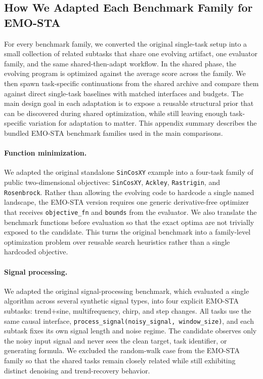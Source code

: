 
\subsection{How We Adapted Each Benchmark Family for EMO-STA}
\label{app:emo-sta-family-adaptations}

For every benchmark family, we converted the original single-task setup into a small collection of related subtasks that share one evolving artifact, one evaluator family, and the same shared-then-adapt workflow. In the shared phase, the evolving program is optimized against the average score across the family. We then spawn task-specific continuations from the shared archive and compare them against direct single-task baselines with matched interfaces and budgets. The main design goal in each adaptation is to expose a reusable structural prior that can be discovered during shared optimization, while still leaving enough task-specific variation for adaptation to matter. This appendix summary describes the bundled EMO-STA benchmark families used in the main comparisons.

\paragraph{Function minimization.}
We adapted the original standalone \texttt{SinCosXY} example into a four-task family of public two-dimensional objectives: \texttt{SinCosXY}, \texttt{Ackley}, \texttt{Rastrigin}, and \texttt{Rosenbrock}. Rather than allowing the evolving code to hardcode a single named landscape, the EMO-STA version requires one generic derivative-free optimizer that receives \texttt{objective\_fn} and \texttt{bounds} from the evaluator. We also translate the benchmark functions before evaluation so that the exact optima are not trivially exposed to the candidate. This turns the original benchmark into a family-level optimization problem over reusable search heuristics rather than a single hardcoded objective.

\paragraph{Signal processing.}
We adapted the original signal-processing benchmark, which evaluated a single algorithm across several synthetic signal types, into four explicit EMO-STA subtasks: trend+sine, multifrequency, chirp, and step changes. All tasks use the same causal interface, \texttt{process\_signal(noisy\_signal, window\_size)}, and each subtask fixes its own signal length and noise regime. The candidate observes only the noisy input signal and never sees the clean target, task identifier, or generating formula. We excluded the random-walk case from the EMO-STA family so that the shared tasks remain closely related while still exhibiting distinct denoising and trend-recovery behavior.

